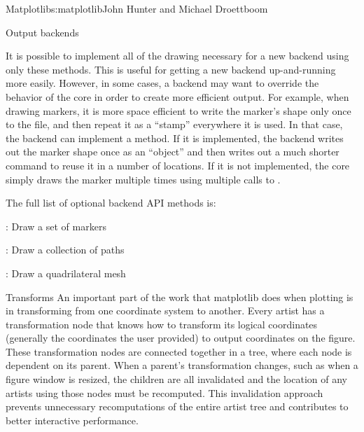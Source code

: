 \begin{aosachapter}{Matplotlib}{s:matplotlib}{John Hunter and Michael Droettboom}
\begin{aosasect1}{Output backends}
\begin{aosaitemize}
\end{aosaitemize}

It is possible to implement all of the drawing necessary for a new
backend using only these methods.  This is useful for getting a new
backend up-and-running more easily.  However, in some cases, a backend
may want to override the behavior of the core in order to create more
efficient output.  For example, when drawing markers, it is more space
efficient to write the marker's shape only once to the file, and then
repeat it as a ``stamp'' everywhere it is used.  In that case, the
backend can implement a  method.  If it is
implemented, the backend writes out the marker shape once as an
``object'' and then writes out a much shorter command to reuse it in
a number of locations.  If it is not implemented, the core simply
draws the marker multiple times using multiple calls to
.

The full list of optional backend API methods is:

\begin{aosaitemize}

  \item {}: Draw a set of markers

  \item {}: Draw a collection of paths

  \item {}: Draw a quadrilateral mesh

\end{aosaitemize}

\end{aosasect1}

\begin{aosasect1}{Transforms}
An important part of the work that matplotlib does when plotting is in
transforming from one coordinate system to another.  Every artist has
a transformation node that knows how to transform its logical
coordinates (generally the coordinates the user provided) to output
coordinates on the figure.  These transformation nodes are connected
together in a tree, where each node is dependent on its parent.  When
a parent's transformation changes, such as when a figure window is
resized, the children are all invalidated and the location of any
artists using those nodes must be recomputed.  This invalidation
approach prevents unnecessary recomputations of the entire artist tree
and contributes to better interactive performance.


\end{aosasect1}
\end{aosachapter}
